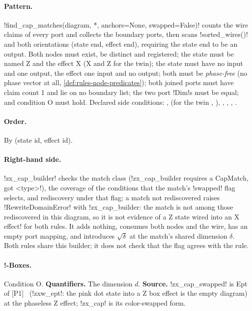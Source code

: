 \paragraph{Pattern.} \py!find_cap_matches(diagram, *, anchors=None, swapped=False)! counts the wire claims of every port and collects the boundary ports, then scans \py!sorted_wires()! and both orientations (state end, effect end), requiring the state end to be an output. Both nodes must exist, be distinct and registered; the state must be named Z and the effect X (X and Z for the twin); the state must have no input and one output, the effect one input and no output; both must be \emph{phase-free} (no phase vector at all, \cref{def:rules-node-predicates}); both joined ports must have claim count 1 and lie on no boundary list; the two port \py!Dim!s must be equal; and condition O must hold. Declared side conditions: ,  (for the twin , ), , , , .

\paragraph{Order.} By (state id, effect id).

\paragraph{Right-hand side.} \py!zx_cap_builder! checks the match class (\code!zx_cap_builder requires a CapMatch, got <type>!), the coverage of the conditions that the match's \py!swapped! flag selects, and rediscovery under that flag; a match not rediscovered raises \py!RewriteDomainError! with \code!zx_cap_builder: the match is not among those rediscovered in this diagram, so it is not evidence of a Z state wired into an X effect! for both rules. It adds nothing, consumes both nodes and the wire, has an empty port mapping, and introduces $\sqrt{\delta}$ at the match's shared dimension $\delta$. Both rules share this builder; it does not check that the flag agrees with the rule.

\paragraph{!-Boxes.} Condition O. \textbf{Quantifiers.} The dimension $d$. \textbf{Source.} \azx!zx_cap_swapped! is Ept of [P1]~\cite{poor2023zxw} (\py!zxw_ept!: the pink dot state into a Z box effect is the empty diagram) at the phaseless Z effect; \azx!zx_cap! is its color-swapped form.

